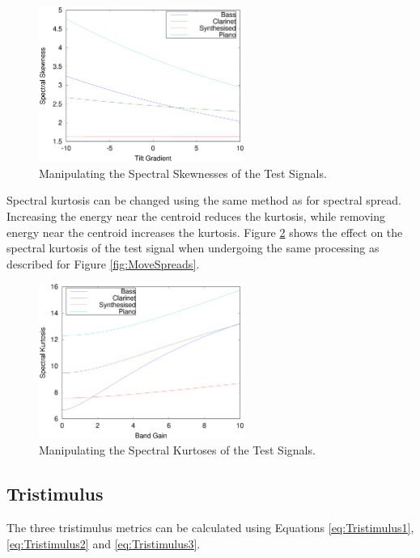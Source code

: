 			\begin{figure}[h!]
				\centering
				\includegraphics[width=0.6\textwidth]{chapter6/Images/MoveSkewnesses.eps}
				\caption{Manipulating the Spectral Skewnesses of the Test Signals.}
				\label{fig:MoveSkewnesses}
			\end{figure}


			Spectral kurtosis can be changed using the same method as for spectral spread. Increasing the
			energy near the centroid reduces the kurtosis, while removing energy near the centroid increases
			the kurtosis. Figure \ref{fig:MoveKurtoses} shows the effect on the spectral kurtosis of the test
			signal when undergoing the same processing as described for Figure \ref{fig:MoveSpreads}.
			
			\begin{figure}[h!]
				\centering
				\includegraphics[width=0.6\textwidth]{chapter6/Images/MoveKurtoses.eps}
				\caption{Manipulating the Spectral Kurtoses of the Test Signals.}
				\label{fig:MoveKurtoses}
			\end{figure}


	\subsection{Tristimulus}
	\label{sec:FeatureControl-Parameterisation-Tristimulus}
		The three tristimulus metrics can be calculated using Equations \ref{eq:Tristimulus1},
		\ref{eq:Tristimulus2} and \ref{eq:Tristimulus3}.
		
